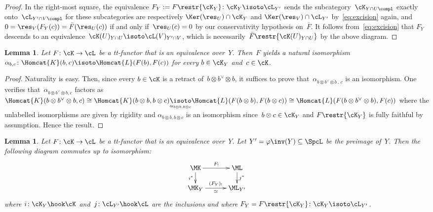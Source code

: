 \documentclass[11pt]{amsart}
\numberwithin{equation}{section} %
\theoremstyle{plain}
\newtheorem{lem}[equation]{Lemma}
\theoremstyle{definition}
\theoremstyle{remark}
\begin{document}
\begin{proof}
In the right-most square, the equivalence $F_Y:=F\restr{\cK_Y}\colon\cK_Y\isoto \cL_{Y'}$ sends the subcategory~$\cK_{Y\cap U\compl}$ exactly onto~$\cL_{Y'\cap V\compl}$ for these subcategories are respectively $\Ker(\res_U)\cap\cK_Y$ and $\Ker(\res_V)\cap\cL_{Y'}$ by~\eqref{eq:excision} again, and $0=\res_V(F_Y(c))=\bar{F}(\res_U(c))$ if and only if~$\res_U(c)=0$ by our conservativity hypothesis on~$\bar{F}$. It follows from~\eqref{eq:excision} that $F_Y$ descends to an equivalence~$\cK(U)_{Y\cap U}\isoto \cL(V)_{Y'\cap V}$, which is necessarily~$\bar{F}\restr{\cK(U)_{Y\cap U}}$ by the above diagram.
\end{proof}

%
\begin{lem}
\label{lem:equiv-on-Y-Hom}%
Let $F\colon \cK\to \cL$ be a tt-functor that is an equivalence over~$Y$. 
Then~$F$ yields a natural isomorphism~$\alpha_{b,c}\colon \Homcat{K}(b,c)\isoto \Homcat{L}(F(b),F(c))$ for every $b\in \cK_Y$ and~$c\in\cK$.
\end{lem}
%
\begin{proof}
Naturality is easy.
Then, since every $b\in\cK$ is a retract of~$b\otimes b^\vee\otimes b$, it suffices to prove that~$\alpha_{b\otimes b^\vee\otimes b\,,\,c}$ is an isomorphism.
One verifies that~$\alpha_{b\otimes b^\vee \otimes b,c}$ factors as ${\Homcat{K}(b\otimes b^\vee\otimes b, c)}\cong{\Homcat{K}(b \otimes b,b\otimes c)}
\underset{\alpha_{b\otimes b,b\otimes c}}{\isoto}
{\Homcat{L}(F(b \otimes b),F(b\otimes c))} \cong {\Homcat{L}(F(b\otimes b^\vee\otimes b), F(c))}$
%
where the unlabelled isomorphisms are given by rigidity and $\alpha_{b\otimes b,b\otimes c}$ is an isomorphism since~$b\otimes c\in\cK_Y$ and $F\restr{\cK_Y}$ is fully faithful by assumption. Hence the result.
\end{proof}
%
\begin{lem}
\label{lem:F!-restr}%
Let $F\colon \cK\to \cL$ be a tt-functor that is an equivalence over~$Y$. Let $Y' = \varphi\inv(Y) \subseteq \SpcL$ be the preimage of~$Y$.
Then the following diagram commutes up to isomorphism:
%
\begin{equation}
\label{eq:F!-restriction}%
\vcenter{\xymatrix@C=3em@R=1.5em{
\MK \ar[r]^-{F_!} \ar[d]_-{i^*}
& \ML \ar[d]^-{j^*}
\\
{\MK_Y} \ar[r]^-{(F_Y)_!}_-{\simeq}
& {\ML_{Y'}}
}}
\end{equation}
%
where $i\colon \cK_Y\hook\cK$ and~$j\colon \cL_{Y'}\hook\cL$ are the inclusions and where $F_Y=F\restr{\cK_Y}\colon \cK_Y\isoto \cL_{Y'}$.
\end{lem}
\end{document}
